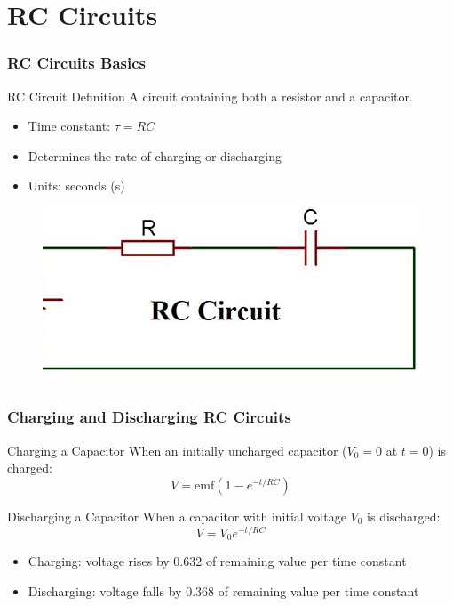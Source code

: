 \documentclass{beamer}
\begin{document}
\section{RC Circuits}
\begin{frame}
    \frametitle{RC Circuits Basics}
    \begin{block}{RC Circuit Definition}
        A circuit containing both a resistor and a capacitor.
    \end{block}
    \begin{itemize}
        \item Time constant: $\tau = RC$
        \item Determines the rate of charging or discharging
        \item Units: seconds (s)
    \end{itemize}
   
        \begin{figure}
            \centering
            \includegraphics[width=0.65\linewidth]{OIP-C.jpg}
        \end{figure}
  
\end{frame}

\begin{frame}
    \frametitle{Charging and Discharging RC Circuits}
    \begin{block}{Charging a Capacitor}
        When an initially uncharged capacitor ($V_0 = 0$ at $t = 0$) is charged:
        \[ V = \text{emf}(1-e^{-t/RC}) \]
    \end{block}
    \begin{block}{Discharging a Capacitor}
        When a capacitor with initial voltage $V_0$ is discharged:
        \[ V = V_0e^{-t/RC} \]
    \end{block}
    \begin{itemize}
        \item Charging: voltage rises by 0.632 of remaining value per time constant
        \item Discharging: voltage falls by 0.368 of remaining value per time constant
    \end{itemize}
\end{frame}
\end{document}
